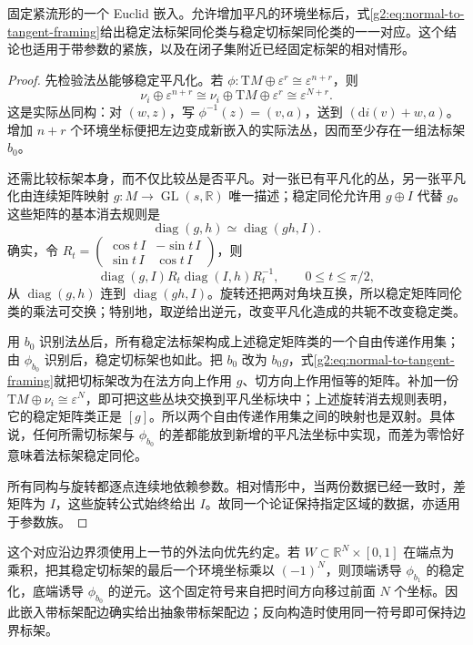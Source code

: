 \begin{lemma}\label{g2:lem:tangent-normal-framing}
	固定紧流形的一个 Euclid 嵌入。允许增加平凡的环境坐标后，式\eqref{g2:eq:normal-to-tangent-framing}给出稳定法标架同伦类与稳定切标架同伦类的一一对应。这个结论也适用于带参数的紧族，以及在闭子集附近已经固定标架的相对情形。
\end{lemma}
\begin{proof}
	先检验法丛能够稳定平凡化。若 \(\phi:\mathrm TM\oplus\varepsilon^r\cong\varepsilon^{n+r}\)，则
	\[
		\nu_i\oplus\varepsilon^{n+r}
		\cong\nu_i\oplus\mathrm TM\oplus\varepsilon^r
		\cong\varepsilon^{N+r}.
	\]
	这是实际丛同构：对 \((w,z)\)，写 \(\phi^{-1}(z)=(v,a)\)，送到 \((\mathrm di(v)+w,a)\)。增加 \(n+r\) 个环境坐标便把左边变成新嵌入的实际法丛，因而至少存在一组法标架 \(b_0\)。

	还需比较标架本身，而不仅比较丛是否平凡。对一张已有平凡化的丛，另一张平凡化由连续矩阵映射 \(g:M\to\operatorname{GL}(s,\mathbb R)\) 唯一描述；稳定同伦允许用 \(g\oplus I\) 代替 \(g\)。这些矩阵的基本消去规则是
	\[
		\operatorname{diag}(g,h)\simeq\operatorname{diag}(gh,I).
	\]
	确实，令 \(R_t=\left(\begin{smallmatrix}\cos t\,I&-\sin t\,I\\ \sin t\,I&\cos t\,I\end{smallmatrix}\right)\)，则
	\[
		\operatorname{diag}(g,I)R_t\operatorname{diag}(I,h)R_t^{-1},
		\qquad 0\le t\le\pi/2,
	\]
	从 \(\operatorname{diag}(g,h)\) 连到 \(\operatorname{diag}(gh,I)\)。旋转还把两对角块互换，所以稳定矩阵同伦类的乘法可交换；特别地，取逆给出逆元，改变平凡化造成的共轭不改变稳定类。

	用 \(b_0\) 识别法丛后，所有稳定法标架构成上述稳定矩阵类的一个自由传递作用集；由 \(\phi_{b_0}\) 识别后，稳定切标架也如此。把 \(b_0\) 改为 \(b_0g\)，式\eqref{g2:eq:normal-to-tangent-framing}就把切标架改为在法方向上作用 \(g\)、切方向上作用恒等的矩阵。补加一份 \(\mathrm TM\oplus\nu_i\cong\varepsilon^N\)，即可把这些丛块交换到平凡坐标块中；上述旋转消去规则表明，它的稳定矩阵类正是 \([g]\)。所以两个自由传递作用集之间的映射也是双射。具体说，任何所需切标架与 \(\phi_{b_0}\) 的差都能放到新增的平凡法坐标中实现，而差为零恰好意味着法标架稳定同伦。

	所有同构与旋转都逐点连续地依赖参数。相对情形中，当两份数据已经一致时，差矩阵为 \(I\)，这些旋转公式始终给出 \(I\)。故同一个论证保持指定区域的数据，亦适用于参数族。
\end{proof}

这个对应沿边界须使用上一节的外法向优先约定。若 \(W\subset\mathbb R^N\times[0,1]\) 在端点为乘积，把其稳定切标架的最后一个环境坐标乘以 \((-1)^N\)，则顶端诱导 \(\phi_{b_1}\) 的稳定化，底端诱导 \(\phi_{b_0}\) 的逆元。这个固定符号来自把时间方向移过前面 \(N\) 个坐标。因此嵌入带标架配边确实给出抽象带标架配边；反向构造时使用同一符号即可保持边界标架。

